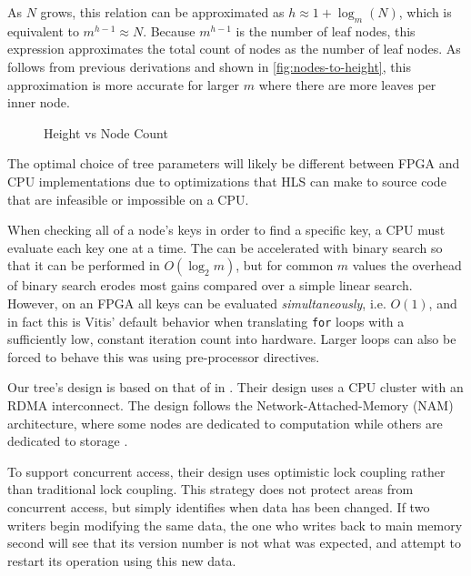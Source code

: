 As $N$ grows, this relation can be approximated as $h \approx 1 + \log_m(N)$,
which is equivalent to  $m^{h-1} \approx N$. Because $m^{h-1}$ is the number of
leaf nodes, this expression approximates the total count of nodes as the number
of leaf nodes. As follows from previous derivations and shown in
\autoref{fig:nodes-to-height}, this approximation is more accurate for larger $m$
where there are more leaves per inner node.

\begin{figure}[H]
	\centering
	
	\caption{Height vs Node Count}
	\label{fig:nodes-to-height}
\end{figure}



The optimal choice of tree parameters will likely be different between FPGA and
CPU implementations due to optimizations that HLS can make to source code that
are infeasible or impossible on a CPU.

When checking all of a node's keys in order to find a specific key, a CPU must
evaluate each key one at a time. The can be accelerated with binary search so
that it can be performed in $O(\log_2 m)$, but for common $m$ values the
overhead of binary search erodes most gains compared over a simple linear
search. However, on an FPGA all keys can be evaluated \emph{simultaneously},
i.e. $O(1)$, and in fact this is Vitis' default behavior when translating
\texttt{for} loops with a sufficiently low, constant iteration count into
hardware. Larger loops can also be forced to behave this was using pre-processor
directives.



\label{subsec:concurrency}

Our tree's design is based on that of \citeauthor{base} in .
Their design uses a CPU cluster with an RDMA interconnect. The design follows
the Network-Attached-Memory (NAM) architecture, where some nodes are dedicated
to computation while others are dedicated to storage
\autocite{base,binnig-vldb-2016}.

To support concurrent access, their design uses optimistic lock coupling rather
than traditional lock coupling. This strategy does not protect areas from
concurrent access, but simply identifies when data has been changed. If two
writers begin modifying the same data, the one who writes back to main memory
second will see that its version number is not what was expected, and attempt to
restart its operation using this new data.

